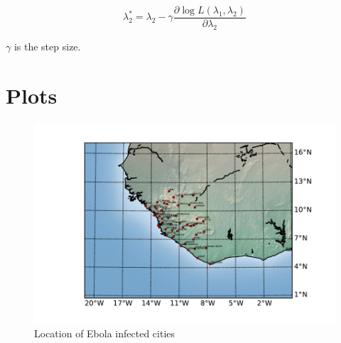 \documentclass[12pt]{article}
\begin{document}
$$\lambda_2^* = \lambda_2 - \gamma \frac{\partial \log L(\lambda_1, \lambda_2)}{\partial \lambda_2}$$

$\gamma$ is the step size.





\section{Plots}


\begin{figure}[hbt]
\begin{center}
  \includegraphics[width=6in]{graph/map2.pdf}
  \caption{Location of Ebola infected cities}
\end{center}  
\end{figure}
\end{document}
